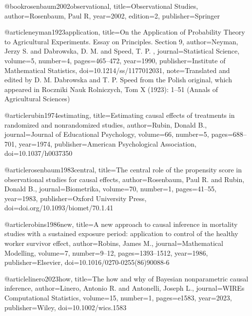 

@book{rosenbaum2002observational,
 title={Observational Studies},
 author={Rosenbaum, Paul R},
 year={2002},
 edition={2},
 publisher={Springer}
}




@article{neyman1923application,
  title={On the Application of Probability Theory to Agricultural Experiments. Essay on Principles. Section 9},
  author={Neyman, Jerzy S. and Dabrowska, D. M. and  Speed, T. P. },
  journal={Statistical Science},
  volume={5},
  number={4},
  pages={465--472},
  year={1990},
  publisher={Institute of Mathematical Statistics},
  doi={10.1214/ss/1177012031},
  note={Translated and edited by D. M. Dabrowska and T. P. Speed from the Polish original, which appeared in Roczniki Nauk Rolniczych, Tom X (1923): 1–51 (Annals of Agricultural Sciences)}
}






@article{rubin1974estimating,
  title={Estimating causal effects of treatments in randomized and nonrandomized studies},
  author={Rubin, Donald B.},
  journal={Journal of Educational Psychology},
  volume={66},
  number={5},
  pages={688--701},
  year={1974},
  publisher={American Psychological Association},
  doi={10.1037/h0037350}
}





@article{rosenbaum1983central,
  title={The central role of the propensity score in observational studies for causal effects},
  author={Rosenbaum, Paul R. and Rubin, Donald B.},
  journal={Biometrika},
  volume={70},
  number={1},
  pages={41--55},
  year={1983},
  publisher={Oxford University Press},
  doi={doi.org/10.1093/biomet/70.1.41}
}





@article{robins1986new,
  title={A new approach to causal inference in mortality studies with a sustained exposure period: application to control of the healthy worker survivor effect},
  author={Robins, James M.},
  journal={Mathematical Modelling},
  volume={7},
  number={9--12},
  pages={1393--1512},
  year={1986},
  publisher={Elsevier},
  doi={10.1016/0270-0255(86)90088-6}
}





@article{linero2023how,
  title={The how and why of Bayesian nonparametric causal inference},
  author={Linero, Antonio R. and Antonelli, Joseph L.},
  journal={WIREs Computational Statistics},
  volume={15},
  number={1},
  pages={e1583},
  year={2023},
  publisher={Wiley},
  doi={10.1002/wics.1583}
}






